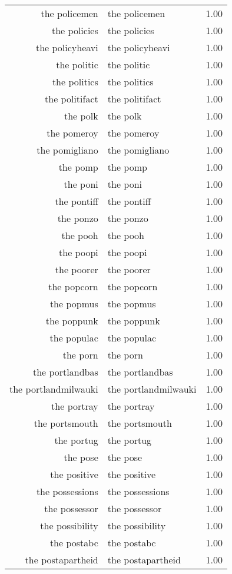 \begin{table}[ht]
\begin{tabular}{rlr}
  the policemen & the policemen & 1.00 \\ 
  the policies & the policies & 1.00 \\ 
  the policyheavi & the policyheavi & 1.00 \\ 
  the politic & the politic & 1.00 \\ 
  the politics & the politics & 1.00 \\ 
  the politifact & the politifact & 1.00 \\ 
  the polk & the polk & 1.00 \\ 
  the pomeroy & the pomeroy & 1.00 \\ 
  the pomigliano & the pomigliano & 1.00 \\ 
  the pomp & the pomp & 1.00 \\ 
  the poni & the poni & 1.00 \\ 
  the pontiff & the pontiff & 1.00 \\ 
  the ponzo & the ponzo & 1.00 \\ 
  the pooh & the pooh & 1.00 \\ 
  the poopi & the poopi & 1.00 \\ 
  the poorer & the poorer & 1.00 \\ 
  the popcorn & the popcorn & 1.00 \\ 
  the popmus & the popmus & 1.00 \\ 
  the poppunk & the poppunk & 1.00 \\ 
  the populac & the populac & 1.00 \\ 
  the porn & the porn & 1.00 \\ 
  the portlandbas & the portlandbas & 1.00 \\ 
  the portlandmilwauki & the portlandmilwauki & 1.00 \\ 
  the portray & the portray & 1.00 \\ 
  the portsmouth & the portsmouth & 1.00 \\ 
  the portug & the portug & 1.00 \\ 
  the pose & the pose & 1.00 \\ 
  the positive & the positive & 1.00 \\ 
  the possessions & the possessions & 1.00 \\ 
  the possessor & the possessor & 1.00 \\ 
  the possibility & the possibility & 1.00 \\ 
  the postabc & the postabc & 1.00 \\ 
  the postapartheid & the postapartheid & 1.00 \\ 

\end{tabular}
\end{table}
